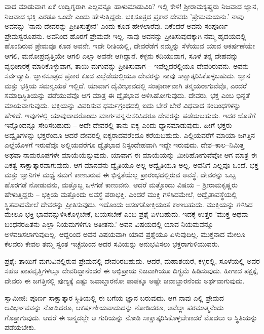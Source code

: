 ವಾದ ಮಾಡುವಾಗ ಏಕೆ ಉದ್ವಿಗ್ನರಾಗಿ ಎಲ್ಲವನ್ನೂ ಹಾಳುಮಾಡುವಿರಿ? ಇಲ್ಲಿ ಕೇಳಿ! ಶ‍್ರೀರಾಮಕೃಷ್ಣರು ನಿಜವಾದ ಜ್ಞಾನ, ನಿಜವಾದ ಭಕ್ತಿ ಎರಡೂ ಒಂದೇ ಎಂದು ಹೇಳುತ್ತಿದ್ದರು. ಭಕ್ತಿಸೂತ್ರದ ಪ್ರಕಾರ ದೇವರು 'ಪ್ರೇಮಮಯನು.' ನಾವು ಅವನನ್ನು 'ನಾನು ದೇವರನ್ನು ಪ್ರೀತಿಸುತ್ತೇನೆ' ಎಂದು ಕೂಡ ಹೇಳಲಾರೆವು. ಏಕೆಂದರೆ ಅವನು ಸಂಪೂರ್ಣ ಪ್ರೇಮಸ್ವರೂಪನು. ಅವನಿಂದ ಹೊರಗೆ ಪ್ರೇಮವೇ ಇಲ್ಲ. ನಾವು ಅವನನ್ನು ಪ್ರೀತಿಸುವುದಕ್ಕಾಗಿ ನಮ್ಮ ಹೃದಯದಲ್ಲಿ ಹೊಂದಿರುವ ಪ್ರೇಮವೂ ಕೂಡ ಅವನೇ. ಇದೇ ರೀತಿಯಲ್ಲಿ, ದೇವರೆಡೆಗೆ ನಮ್ಮನ್ನು ಸೆಳೆಯುವ ಯಾವ ಆಕರ್ಷಣೆಯೇ ಆಗಲಿ, ಮನೋಪ್ರವೃತ್ತಿಯೇ ಆಗಲಿ ಎಲ್ಲಾ ಅವನೇ ಆಗಿದ್ದಾನೆ. ಕಳ್ಳನು ಕದಿಯುವಾಗ, ಸೂಳೆ ತನ್ನ ದೇಹವನ್ನು ವ್ಯಭಿಚಾರಕ್ಕೆ ಮಾರಿಕೊಳ್ಳುವಾಗ, ತಾಯಿ ಮಗುವನ್ನು ಪ್ರೀತಿಸುವಾಗ – ಇವೆಲ್ಲದರಲ್ಲಿಯೂ ದೇವರಿರುವನು. ಅವನು ಸರ್ವವ್ಯಾಪಿ. ಜ್ಞಾನಸೂತ್ರದ ಪ್ರಕಾರ ಕೂಡ ಎಲ್ಲೆಡೆಯಲ್ಲಿಯೂ ದೇವರನ್ನು ನಾವು ಸಾಕ್ಷಾತ್ಕರಿಸಿಕೊಳ್ಳಬಹುದು. ಜ್ಞಾನ ಮತ್ತು ಭಕ್ತಿಯ ಸಮನ್ವಯತೆ ಇಲ್ಲಿದೆ. ಯಾವಾಗ ದೈವೀಭಾವದಲ್ಲಿ ಸಂಪೂರ್ಣವಾಗಿ ತನ್ಮಯರಾಗುವೆವೊ, ಎಂದರೆ ಸಮಾಧಿಸ್ಥಿತಿಯನ್ನು ಪಡೆಯುವೆವೊ ಆಗ ಮಾತ್ರ ಈ ದ್ವೈತಭಾವ ಅಳಿಸಿಹೋಗುವುದು. ದೇವರು, ಭಕ್ತ ಎಂಬ ಭಿನ್ನತೆ ಮಾಯವಾಗುವುದು. ಭಕ್ತಿಯನ್ನು ವಿವರಿಸುವ ಧರ್ಮಗ್ರಂಥದಲ್ಲಿ ಐದು ಬೇರೆ ಬೇರೆ ವಿಧವಾದ ಸಂಬಂಧಗಳನ್ನು ಹೇಳಿದೆ. ಇವುಗಳಲ್ಲಿ ಯಾವುದಾದರೊಂದು ಮಾರ್ಗವನ್ನನುಸರಿಸಿದರೂ ದೇವರನ್ನು ಪಡೆಯಬಹುದು. ಇದರ ಜೊತೆಗೆ ಇನ್ನೊಂದನ್ನೂ ಸೇರಿಸಬಹುದು – ಅದೇ ದೇವರಲ್ಲಿ ತಾನು ಐಕ್ಯ ಎಂದು ಧ್ಯಾನಮಾಡುವುದು. ಹೀಗೆ ಭಕ್ತರು ಅದ್ವೈತಿಗಳನ್ನು ಭಕ್ತರೆಂದೂ ಆದರೆ ದೇವರಲ್ಲಿ ಐಕ್ಯರಾದವರೆಂದೂ ಕರೆಯಬಹುದು. ಎಲ್ಲಿಯವರೆಗೆ ಮಾಯಾ ಜಗತ್ತಿನ ಎಲ್ಲೆಯೊಳಗೆ ಇರುವೆವೊ ಅಲ್ಲಿಯವರೆಗೂ ದ್ವೈತಭಾವ ನಿಸ್ಸಂದೇಹವಾಗಿ ಇದ್ದೇ ಇರುವುದು. ದೇಶ–ಕಾಲ–ನಿಮಿತ್ತ ಅಥವಾ ನಾಮರೂಪಗಳೇ ಮಾಯೆಯೆನ್ನುವುದು. ಯಾವಾಗ ಈ ಮಾಯೆಯನ್ನು ಮೀರಿಹೋಗುವೆವೋ ಆಗ ಮಾತ್ರ ಈ ಏಕತ್ವ ಸಾಕ್ಷಾತ್ಕಾರವಾಗುವುದು. ಆಗ ಮಾನವನು ದ್ವೈತಿಯೂ ಅಲ್ಲ ಅದ್ವೈತಿಯೂ ಅಲ್ಲ. ಅವನಿಗೆ ಎಲ್ಲವೂ ಒಂದೆ. ಭಕ್ತ ಮತ್ತು ಜ್ಞಾನಿಗಳ ಮಧ್ಯೆ ನಮಗೆ ಕಾಣಬರುವ ಈ ಭಿನ್ನತೆಯೆಲ್ಲ ಪ್ರಾರಂಭದಲ್ಲಿರುವ ಅವಸ್ಥೆ. ದೇವರನ್ನು ಒಬ್ಬ ಹೊರಗಡೆ ನೋಡುವನು, ಮತ್ತೊಬ್ಬ ಒಳಗಡೆ ಕಾಣುವನು. ಆದರೆ ಮತ್ತೊಂದು ವಿಷಯ – ಶ‍್ರೀರಾಮಕೃಷ್ಣರು ಹೇಳುತ್ತಿದ್ದರು – ಭಕ್ತಿಯ ಮತ್ತೊಂದು ಅವಸ್ಥೆ ಪರಾಭಕ್ತಿ. ಎಂದರೆ ಮುಕ್ತಿ ಗಳಿಸಿದಮೇಲೆ, ಅದ್ವೈತಾವಸ್ಥೆಯಲ್ಲಿ ಸ್ಥಿತವಾದಮೇಲೆ ದೇವರನ್ನು ಪ್ರೀತಿಸುವುದು. ಇದೊಂದು ಅಸಂಗತೋಕ್ತಿಯಂತೆ ಕಾಣಬಹುದು. ಮುಕ್ತಿಯನ್ನು ಗಳಿಸಿದ ಮೇಲೂ ಭಕ್ತಿ ಭಾವವನ್ನುಳಿಸಿಕೊಳ್ಳಬೇಕೆ, ಬಯಸಬೇಕೆ ಎಂಬ ಪ್ರಶ್ನೆ ಏಳಬಹುದು. ಇದಕ್ಕೆ ಉತ್ತರ 'ಮುಕ್ತ ಅಥವಾ ಬಂಧನರಹಿತನು ಎಲ್ಲಾ ನಿಯಮಗಳಿಗೂ ಅತೀತನು.' ಅವನ ವಿಷಯದಲ್ಲಿ ಯಾವ ನಿಯಮವನ್ನೂ ಅಳವಡಿಸಲಾಗುವುದಿಲ್ಲ. ಆದ್ದರಿಂದ ಅವನ ವಿಷಯವಾಗಿ ಯಾವ ಪ್ರಶ್ನೆಯೂ ಏಳುವುದಿಲ್ಲ. ಮುಕ್ತನಾದ ಮೇಲೂ ಕೆಲವರು ಕೇವಲ ತಮ್ಮ ಸ್ವಂತ ಇಚ್ಛೆಯಿಂದ ಅದರ ಸವಿಯನ್ನು ಅನುಭವಿಸಲು ಭಕ್ತರಾಗುಳಿಯುವರು.

ಪ್ರಶ್ನೆ: ತಾಯಿಗೆ ಮಗುವಿನಲ್ಲಿರುವ ಪ್ರೇಮದಲ್ಲಿ ದೇವರಿರಬಹುದು. ಆದರೆ, ಮಹಾಶಯರೆ, ಕಳ್ಳರಲ್ಲಿ, ಸೂಳೆಯಲ್ಲಿ ಅವರ ಸಹಜ ಪಾಪವೃತ್ತಿಗಳಲ್ಲೂ ದೇವರಿದ್ದಾನೆಂದರೆ ಈ ಅಭಿಪ್ರಾಯ ನಿಜವಾಗಿಯೂ ದಿಗ್ಭ್ರಮೆ ಹಿಡಿಸುವುದು. ಹೀಗಾದ ಪಕ್ಷಕ್ಕೆ, ದೇವರು ಈ ಜಗತ್ತಿನಲ್ಲಿ ಪುಣ್ಯಕ್ಕೆ ಎಷ್ಟು ಜವಾಬ್ದಾರನೋ ಪಾಪಕ್ಕೂ ಅಷ್ಟೇ ಜವಾಬ್ದಾರನೆಂದು ಅರ್ಥವಾಗುವುದು.

ಸ್ವಾಮೀಜಿ: ಪೂರ್ಣ ಸಾಕ್ಷಾತ್ಕಾರ ಸ್ಥಿತಿಯಲ್ಲಿ ಈ ಬಗೆಯ ಜ್ಞಾನ ಬರುವುದು. ಆಗ ನಾವು ಎಲ್ಲಿ ಪ್ರೇಮದ ಆವಿರ್ಭಾವವನ್ನು ನೋಡಿದರೂ, ಆಕರ್ಷಣೀಯವಾದುದನ್ನು ನೋಡಿದರೂ, ಅವೆಲ್ಲಾ ಪರಮಾತ್ಮನೆಂದು ಗೊತ್ತಾಗುವುದು. ಆದರೆ ಈ ಜನ್ಮದಲ್ಲೇ ಆ ಗುರಿಯನ್ನು ನೋಡಿ ಸಾಕ್ಷಾತ್ಕರಿಸಿಕೊಳ್ಳಬೇಕಾದರೆ ಮೊದಲು ಆ ಸ್ಥಿತಿಯನ್ನು ಪಡೆಯಬೇಕು.

